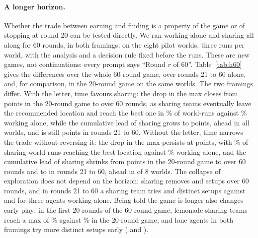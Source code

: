 \paragraph{A longer horizon.}
Whether the trade between earning and finding is a property of the game or of stopping at round 20 can be
tested directly. We ran working alone and sharing all along for 60 rounds, in both framings, on the eight
pilot worlds, three runs per world, with the analysis and a decision rule fixed before the runs. These are new
games, not continuations: every prompt says ``Round $r$ of 60''. Table~\ref{tab:h60} gives the differences
over the whole 60-round game, over rounds 21 to 60 alone, and, for comparison, in the 20-round game on the
same worlds. The two framings differ. With the letter, time favours sharing: the drop in
the max closes from \HLemMaxGame{} points in the 20-round game to \HLemMaxFull{} over 60 rounds, as sharing
teams eventually leave the recommended location and reach the best one in \HLemReachedFullArm\% of world-runs
against \HLemReachedFullSolo\% working alone, while the cumulative lead of sharing grows to \HLemSumFull{}
points, ahead in all \HLemSumFullUp{} worlds, and is still \HLemSumLate{} points in rounds 21 to 60. Without
the letter, time narrows the trade without reversing it: the drop in the max persists at \HAliMaxFull{}
points, with \HAliReachedFullArm\% of sharing world-runs reaching the best location against
\HAliReachedFullSolo\% working alone, and the cumulative lead of sharing shrinks from \HAliSumGame{} points in
the 20-round game to \HAliSumFull{} over 60 rounds and to \HAliSumLate{} in rounds 21 to 60, ahead in
\HAliSumLateUp{} of 8 worlds. The collapse of exploration does not depend on the horizon: sharing removes
\HLemUniqFull{} and \HAliUniqFull{} setups over 60 rounds, and in rounds 21 to 60 a sharing team tries
\HLemUniqLateArm{} and \HAliUniqLateArm{} distinct setups against \HLemUniqLateSolo{} and \HAliUniqLateSolo{}
for three agents working alone. Being told the game is longer also changes early play: in the first 20 rounds
of the 60-round game, lemonade sharing teams reach a max of \ELemShareMaxHsixty\% against
\ELemShareMaxHtwenty\% in the 20-round game, and lone agents in both framings try more distinct setups early
(\ELemSoloUniq{} and \EAliSoloUniq{}).

\begin{table}[t]
  \centering
  \caption{With more rounds the two framings diverge: with the letter, sharing's cost on the max disappears and its earnings lead grows; without it, the cost persists and the lead narrows. Sharing all along relative to working alone, paired over the eight pilot worlds, GPT-5.6, three runs per world, in 60-round games and, for comparison, in the 20-round game on the same worlds. Max and cumulative earnings in percentage points of the optimum; distinct setups in counts; reached best location in percentage points of world-runs. $^{\ast}$ marks $p<0.05$ on the exact sign-flip test.}
  \label{tab:h60}
  \scriptsize
  \setlength{\tabcolsep}{4pt}
  
\end{table}

